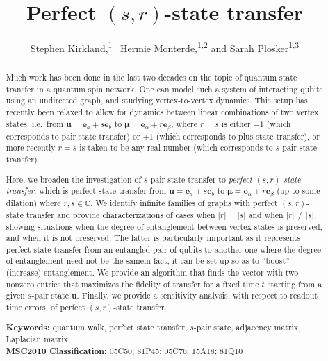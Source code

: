 \documentclass{article}
\numberwithin{equation}{section}
\newcommand{\be}{\mathbf e}
\newcommand{\bu}{\mathbf u}
\newcommand{\bmu}{{\boldsymbol{\mu}}}
\def\C{\mathbb{C}}
\begin{document}
\title{Perfect $(s,r)$-state transfer}

\author{ 
	Stephen Kirkland,\textsuperscript{1} \ Hermie Monterde,\textsuperscript{1,2} and  Sarah Plosker\textsuperscript{1,3}
}

\maketitle

\begin{abstract}
Much work has been done in the last two decades on the topic of quantum state transfer in a quantum spin network. One can model such a system of interacting qubits using an undirected graph, and studying vertex-to-vertex dynamics. This setup has recently been relaxed to allow for dynamics between linear combinations of two vertex states, i.e.\ from $\bu = \be_a + s \be_b$ to $\bmu=\be_{\alpha} + r \be_{\beta}$, where $r=s$ is either $-1$ (which corresponds to pair state transfer) or $+1$ (which corresponds to plus state transfer), or more recently $r=s$ is taken to be any real number (which corresponds to $s$-pair state transfer). 

Here, we broaden the investigation of $s$-pair state transfer to \textit{perfect $(s,r)$-state transfer}, which is perfect state transfer from $\bu = \be_a + s \be_b$ to $\bmu=\be_{\alpha} + r \be_{\beta}$ (up to some dilation) where $r,s\in \C$. We identify infinite families of graphs with perfect $(s,r)$-state transfer and provide characterizations of cases when $|r|= |s|$ and when $|r|\neq |s|$, showing situations when the degree of entanglement between vertex states is preserved, and when it is not preserved. The latter is particularly important as it represents perfect state transfer from an entangled pair of qubits to another one where the degree of entanglement need not be the same\mdash in fact, it can be set up so as to ``boost'' (increase) entanglement. We provide an algorithm that finds the vector with two nonzero entries that maximizes the fidelity of transfer for a fixed time $t$ starting from a given $s$-pair state $\bu$. Finally, we provide a sensitivity analysis, with respect to readout time errors, of perfect $(s,r)$-state transfer.

\medskip

\noindent \textbf{Keywords:} quantum walk, perfect state transfer, $s$-pair state, adjacency matrix, Laplacian matrix\\
	
\noindent \textbf{MSC2010 Classification:} %
05C50; %
81P45; %
05C76; %
15A18; %
81Q10 %
 
\end{abstract}
\end{document}
